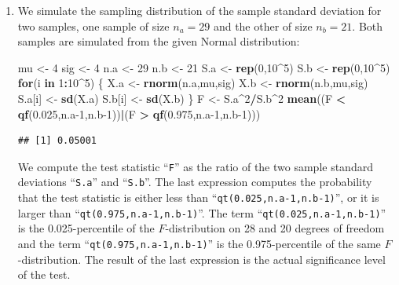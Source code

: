 \documentclass[]{krantz}
\makeatletter
\newenvironment{Shaded}{\begin{snugshade}}{\end{snugshade}}
\newcommand{\ControlFlowTok}[1]{\textcolor[rgb]{0.13,0.29,0.53}{\textbf{#1}}}
\newcommand{\DecValTok}[1]{\textcolor[rgb]{0.00,0.00,0.81}{#1}}
\newcommand{\FloatTok}[1]{\textcolor[rgb]{0.00,0.00,0.81}{#1}}
\newcommand{\KeywordTok}[1]{\textcolor[rgb]{0.13,0.29,0.53}{\textbf{#1}}}
\newcommand{\NormalTok}[1]{#1}
\newcommand{\OperatorTok}[1]{\textcolor[rgb]{0.81,0.36,0.00}{\textbf{#1}}}
\newcommand{\StringTok}[1]{\textcolor[rgb]{0.31,0.60,0.02}{#1}}
\newenvironment{kframe}{%
\medskip{}
\setlength{\fboxsep}{.8em}
 \def\at@end@of@kframe{}%
 \ifinner\ifhmode%
  \def\at@end@of@kframe{\end{minipage}}%
  \begin{minipage}{\columnwidth}%
 \fi\fi%
 \def\FrameCommand##1{\hskip\@totalleftmargin \hskip-\fboxsep
 \colorbox{shadecolor}{##1}\hskip-\fboxsep
     \hskip-\linewidth \hskip-\@totalleftmargin \hskip\columnwidth}%
 \MakeFramed {\advance\hsize-\width
   \@totalleftmargin\z@ \linewidth\hsize
   \@setminipage}}%
 {\par\unskip\endMakeFramed%
 \at@end@of@kframe}
\renewenvironment{Shaded}{\begin{kframe}}{\end{kframe}}
\theoremstyle{definition}
\theoremstyle{definition}
\theoremstyle{definition}
\theoremstyle{remark}
\makeatother
\begin{document}
\begin{enumerate}
\def\labelenumi{\arabic{enumi}.}
\item
  We simulate the sampling distribution
  of the sample standard deviation for two samples, one sample of size
  \(n_a = 29\) and the other of size \(n_b=21\). Both samples are simulated
  from the given Normal distribution:

\begin{Shaded}
\begin{Highlighting}[]
\NormalTok{mu <-}\StringTok{ }\DecValTok{4}
\NormalTok{sig <-}\StringTok{ }\DecValTok{4}
\NormalTok{n.a <-}\StringTok{ }\DecValTok{29}
\NormalTok{n.b <-}\StringTok{ }\DecValTok{21}
\NormalTok{S.a <-}\StringTok{ }\KeywordTok{rep}\NormalTok{(}\DecValTok{0}\NormalTok{,}\DecValTok{10}\OperatorTok{^}\DecValTok{5}\NormalTok{)}
\NormalTok{S.b <-}\StringTok{ }\KeywordTok{rep}\NormalTok{(}\DecValTok{0}\NormalTok{,}\DecValTok{10}\OperatorTok{^}\DecValTok{5}\NormalTok{)}
\ControlFlowTok{for}\NormalTok{(i }\ControlFlowTok{in} \DecValTok{1}\OperatorTok{:}\DecValTok{10}\OperatorTok{^}\DecValTok{5}\NormalTok{) \{}
\NormalTok{  X.a <-}\StringTok{ }\KeywordTok{rnorm}\NormalTok{(n.a,mu,sig)}
\NormalTok{  X.b <-}\StringTok{ }\KeywordTok{rnorm}\NormalTok{(n.b,mu,sig)}
\NormalTok{  S.a[i] <-}\StringTok{ }\KeywordTok{sd}\NormalTok{(X.a)}
\NormalTok{  S.b[i] <-}\StringTok{ }\KeywordTok{sd}\NormalTok{(X.b)}
\NormalTok{\}}
\NormalTok{F <-}\StringTok{ }\NormalTok{S.a}\OperatorTok{^}\DecValTok{2}\OperatorTok{/}\NormalTok{S.b}\OperatorTok{^}\DecValTok{2}
\KeywordTok{mean}\NormalTok{((F }\OperatorTok{<}\StringTok{ }\KeywordTok{qf}\NormalTok{(}\FloatTok{0.025}\NormalTok{,n.a}\DecValTok{-1}\NormalTok{,n.b}\DecValTok{-1}\NormalTok{))}\OperatorTok{|}\NormalTok{(F }\OperatorTok{>}\StringTok{ }\KeywordTok{qf}\NormalTok{(}\FloatTok{0.975}\NormalTok{,n.a}\DecValTok{-1}\NormalTok{,n.b}\DecValTok{-1}\NormalTok{)))}
\end{Highlighting}
\end{Shaded}

\begin{verbatim}
## [1] 0.05001
\end{verbatim}

  We compute the test statistic ``\texttt{F}'' as the ratio of the two sample
  standard deviations ``\texttt{S.a}'' and ``\texttt{S.b}''. The last expression computes
  the probability that the test statistic is either less than
  ``\texttt{qt(0.025,n.a-1,n.b-1)}'', or it is larger than
  ``\texttt{qt(0.975,n.a-1,n.b-1)}''. The term ``\texttt{qt(0.025,n.a-1,n.b-1)}'' is the
  0.025-percentile of the \(F\)-distribution on 28 and 20 degrees of freedom
  and the term ``\texttt{qt(0.975,n.a-1,n.b-1)}'' is the 0.975-percentile of the
  same \(F\)-distribution. The result of the last expression is the actual
  significance level of the test.


\end{enumerate}
\end{document}
